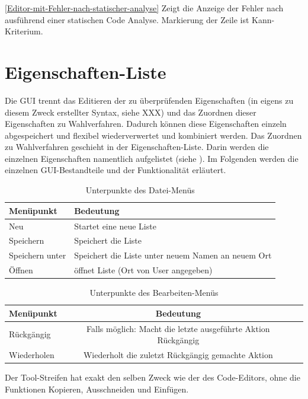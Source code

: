 \documentclass[a4paper]{scrreprt}
\begin{document}
\ref{Editor-mit-Fehler-nach-statischer-analyse} Zeigt die Anzeige der Fehler nach ausführend einer statischen Code Analyse. Markierung der Zeile ist Kann-Kriterium.

\section{Eigenschaften-Liste}
Die GUI trennt das Editieren der zu überprüfenden Eigenschaften (in eigens zu diesem Zweck erstellter Syntax, siehe XXX) und das Zuordnen dieser Eigenschaften zu Wahlverfahren. Dadurch können diese Eigenschaften einzeln abgespeichert und flexibel wiederverwertet und kombiniert werden. Das Zuordnen zu Wahlverfahren geschieht in der Eigenschaften-Liste. Darin werden die einzelnen Eigenschaften namentlich aufgelistet (siehe ). Im Folgenden werden die einzelnen \ac{GUI}-Bestandteile und der Funktionalität erläutert.

\begin{table}[H]
\begin{tabular}{|p{3cm}|p{12cm}|}
Menüpunkt & Bedeutung \\
\hline
Neu & Startet eine neue Liste \\
Speichern & Speichert die Liste \\
Speichern unter & Speichert die Liste unter neuem Namen an neuem Ort \\
Öffnen & öffnet Liste (Ort von User angegeben)
\end{tabular}
\label{Eigenschaftenliste-Datei-Menüpunkte}
\caption{Unterpunkte des Datei-Menüs}
\end{table}

\begin{table}[H]
\begin{tabular}{lcr} 
Menüpunkt & Bedeutung \\
\hline
Rückgängig & Falls möglich: Macht die letzte ausgeführte Aktion Rückgängig \\
Wiederholen & Wiederholt die zuletzt Rückgängig gemachte Aktion 
\end{tabular}
\label{Eigenschaftenliste-Bearbeiten-Menüpunkte}
\caption{Unterpunkte des Bearbeiten-Menüs}
\end{table}

Der Tool-Streifen hat exakt den selben Zweck wie der des Code-Editors, ohne die Funktionen Kopieren, Ausschneiden und Einfügen.
\end{document}
